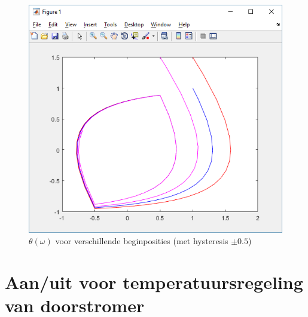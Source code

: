\documentclass[12pt]{article}
\begin{document}
\begin{figure}
	\centering
	\includegraphics[height=0.4\textheight, keepaspectratio]{xydriehyssmaller.png}
	\caption{$\theta(\omega)$ voor verschillende beginposities (met hysteresis $\pm 0.5$)}
	\label{xydriehys}
\end{figure}
\clearpage
\part{Aan/uit voor temperatuursregeling van doorstromer}
\setcounter{section}{0}
\end{document}
